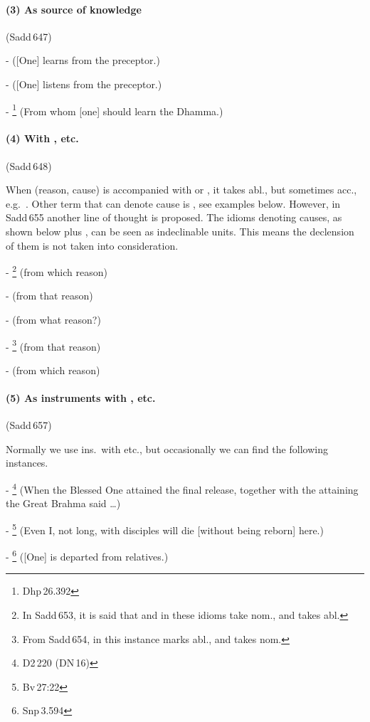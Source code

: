 \paragraph*{(3) As source of knowledge} (Sadd\,647)\par
-  ([One] learns from the preceptor.)\par
-  ([One] listens from the preceptor.)\par
- \footnote{Dhp\,26.392} (From whom [one] should learn the Dhamma.)\par

\paragraph*{(4) With , etc.} (Sadd\,648)\par
When  (reason, cause) is accompanied with  or , it takes abl., but sometimes acc., e.g.\ . Other term that can denote cause is , see examples below. However, in Sadd\,655 another line of thought is proposed. The idioms denoting causes, as shown below plus , can be seen as indeclinable units. This means the declension of them is not taken into consideration.\par
- \footnote{In Sadd\,653, it is said that  and  in these idioms take nom., and  takes abl.} (from which reason)\par
-  (from that reason)\par
-  (from what reason?)\par
- \footnote{From Sadd\,654, in this instance  marks abl., and  takes nom.} (from that reason)\par
-  (from which reason)\par

\paragraph*{(5) As instruments with , etc.} (Sadd\,657)\par
Normally we use ins.\ with  etc., but occasionally we can find the following instances.\par
- \footnote{D2\,220 (DN\,16)} (When the Blessed One attained the final release, together with the attaining the Great Brahma said \ldots)\par
- \footnote{Bv\,27:22} (Even I, not long, with disciples will die [without being reborn] here.)\par
- \footnote{Snp\,3.594} ([One] is departed from relatives.)\par

